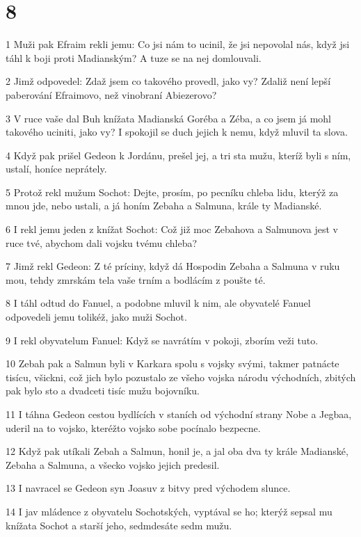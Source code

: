 \chapter{8}

\par 1 Muži pak Efraim rekli jemu: Co jsi nám to ucinil, že jsi nepovolal nás, když jsi táhl k boji proti Madianským? A tuze se na nej domlouvali.
\par 2 Jimž odpovedel: Zdaž jsem co takového provedl, jako vy? Zdaliž není lepší paberování Efraimovo, než vinobraní Abiezerovo?
\par 3 V ruce vaše dal Buh knížata Madianská Goréba a Zéba, a co jsem já mohl takového uciniti, jako vy? I spokojil se duch jejich k nemu, když mluvil ta slova.
\par 4 Když pak prišel Gedeon k Jordánu, prešel jej, a tri sta mužu, kteríž byli s ním, ustalí, honíce neprátely.
\par 5 Protož rekl mužum Sochot: Dejte, prosím, po pecníku chleba lidu, kterýž za mnou jde, nebo ustali, a já honím Zebaha a Salmuna, krále ty Madianské.
\par 6 I rekl jemu jeden z knížat Sochot: Což již moc Zebahova a Salmunova jest v ruce tvé, abychom dali vojsku tvému chleba?
\par 7 Jimž rekl Gedeon: Z té príciny, když dá Hospodin Zebaha a Salmuna v ruku mou, tehdy zmrskám tela vaše trním a bodlácím z poušte té.
\par 8 I táhl odtud do Fanuel, a podobne mluvil k nim, ale obyvatelé Fanuel odpovedeli jemu tolikéž, jako muži Sochot.
\par 9 I rekl obyvatelum Fanuel: Když se navrátím v pokoji, zborím veži tuto.
\par 10 Zebah pak a Salmun byli v Karkara spolu s vojsky svými, takmer patnácte tisícu, všickni, což jich bylo pozustalo ze všeho vojska národu východních, zbitých pak bylo sto a dvadceti tisíc mužu bojovníku.
\par 11 I táhna Gedeon cestou bydlících v staních od východní strany Nobe a Jegbaa, uderil na to vojsko, kteréžto vojsko sobe pocínalo bezpecne.
\par 12 Když pak utíkali Zebah a Salmun, honil je, a jal oba dva ty krále Madianské, Zebaha a Salmuna, a všecko vojsko jejich predesil.
\par 13 I navracel se Gedeon syn Joasuv z bitvy pred východem slunce.
\par 14 I jav mládence z obyvatelu Sochotských, vyptával se ho; kterýž sepsal mu knížata Sochot a starší jeho, sedmdesáte sedm mužu.
